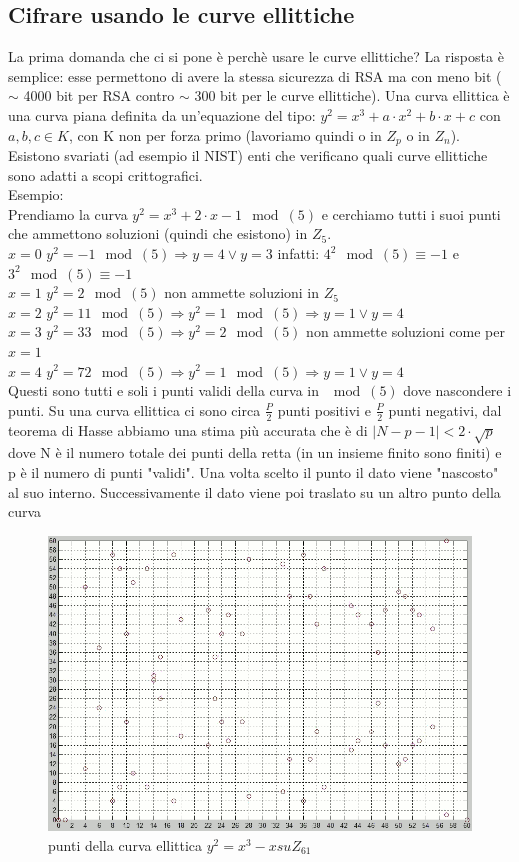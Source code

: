 \documentclass[10pt,a4paper]{article}
\begin{document}
\subsection{Cifrare usando le curve ellittiche}
La prima domanda che ci si pone è perchè usare le curve ellittiche? La risposta è semplice: esse permettono di avere la stessa sicurezza di RSA ma con meno bit ($\sim$ 4000 bit per RSA contro $\sim$ 300 bit per le curve ellittiche). Una curva ellittica è una curva piana definita da un'equazione del tipo: $y^2=x^3+a\cdot x^2+b\cdot x+c$ con $a,b,c \in K$, con K non per forza primo (lavoriamo quindi o in $Z_p$ o in $Z_n$). Esistono svariati (ad esempio il NIST) enti che verificano quali curve ellittiche sono adatti a scopi crittografici.\\
Esempio:\\
Prendiamo la curva $y^2=x^3+2\cdot x-1 \mod(5)$ e cerchiamo tutti i suoi punti che ammettono soluzioni (quindi che esistono) in $Z_5$.\\
$x=0$ $y^2=-1 \mod(5) \Rightarrow y=4 \vee y=3$ infatti: $4^2 \mod(5) \equiv -1$ e $3^2 \mod(5) \equiv -1$\\
$x=1$ $y^2=2 \mod(5)$ non ammette soluzioni in $Z_5$\\
$x=2$ $y^2=11 \mod(5)\Rightarrow y^2=1 \mod(5) \Rightarrow y=1 \vee y=4$\\
$x=3$ $y^2=33 \mod(5)\Rightarrow y^2=2\mod(5)$ non ammette soluzioni come per $x=1$\\
$x=4$ $y^2=72 \mod(5)\Rightarrow y^2=1\mod(5)\Rightarrow y=1 \vee y=4$\\
Questi sono tutti e soli i punti validi della curva in $\mod(5)$ dove nascondere i punti. Su una curva ellittica ci sono circa $\frac{P}{2}$ punti positivi e $\frac{P}{2}$ punti negativi, dal teorema di Hasse abbiamo una stima più accurata che è di $|N-p-1|<2\cdot\sqrt{p}$ dove N è il numero totale dei punti della retta (in un insieme finito sono finiti) e p è il numero di punti "validi". Una volta scelto il punto il dato viene "nascosto" al suo interno. Successivamente il dato viene poi traslato su un altro punto della curva
\begin{figure}[htbp]
\includegraphics[scale=0.3]{immagini/curva_ellittica_punti.PNG}
\caption{punti della curva ellittica $y^2=x^3-x su Z_{61}$}
\end{figure}
\end{document}
